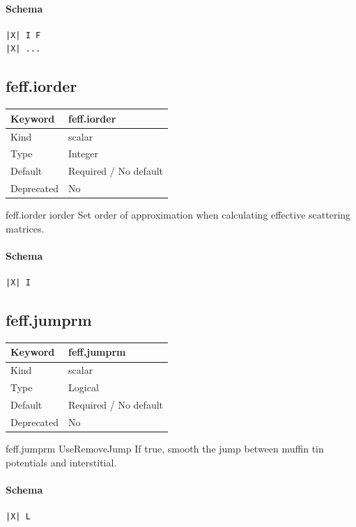 \documentclass[11pt]{article}
\begin{document}
{{{\paragraph{Schema}
\begin{Verbatim}
|X| I F
|X| ...
\end{Verbatim}

\subsection{feff.iorder}
\label{kw:feff-iorder}
\begin{longtable}{|p{1.5in}|p{4.5in}|}
\hline
Keyword & feff.iorder \\
\hline
Kind & scalar \\
\hline
Type & Integer \\
\hline
Default & Required / No default \\
\hline
Deprecated & No \\
\hline
\end{longtable}
 feff.iorder{ iorder }
 Set order of approximation when calculating effective scattering matrices.

\paragraph{Schema}
\begin{Verbatim}
|X| I
\end{Verbatim}

\subsection{feff.jumprm}
\label{kw:feff-jumprm}
\begin{longtable}{|p{1.5in}|p{4.5in}|}
\hline
Keyword & feff.jumprm \\
\hline
Kind & scalar \\
\hline
Type & Logical \\
\hline
Default & Required / No default \\
\hline
Deprecated & No \\
\hline
\end{longtable}
 feff.jumprm{ UseRemoveJump }
 If true, smooth the jump between muffin tin potentials and interstitial.

\paragraph{Schema}
\begin{Verbatim}
|X| L
\end{Verbatim}

}}}
\end{document}
